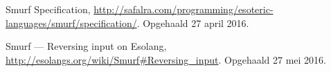 \begin{thebibliography}{9}
	 Smurf Specification,
	\url{http://safalra.com/programming/esoteric-languages/smurf/specification/}.
	Opgehaald 27 april 2016.

	 Smurf --- Reversing input on Esolang,
	\url{http://esolangs.org/wiki/Smurf#Reversing_input}. Opgehaald 27 mei 2016.
\end{thebibliography}

